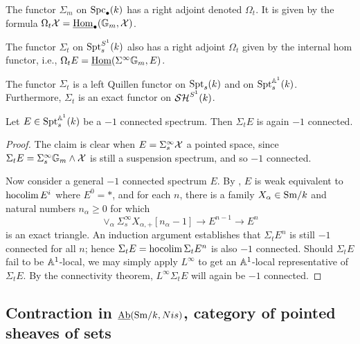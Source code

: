 \documentclass{amsart}%
\begin{document}
\begin{definition}
  The functor $\Sigma_m$ on $\mathrm{Spc}_{\bullet}(k)$ has a right adjoint
  denoted $\Omega_t$. It is given by the formula
  $\Omega_t\mathcal{X} = \underline{\operatorname{Hom}}_{\bullet}(\mathbb{G}_m,\mathcal{X})$.

  The functor $\Sigma_t$ on $\mathrm{Spt}_s^{S^1}(k)$ also has a right adjoint
  $\Omega_t$ given by the internal hom functor, i.e.,
  $\Omega_tE = \underline{\operatorname{Hom}}(\Sigma^{\infty}\mathbb{G}_{m}, E)$.
\end{definition}

\begin{proposition}
  The functor $\Sigma_t$ is a left Quillen functor on $\mathrm{Spt}_s(k)$ and
  on $\mathrm{Spt}_s^{\mathbb{A}^1}(k)$. Furthermore, $\Sigma_t$ is an exact functor
  on $\mathcal{SH}^{S^1}(k)$. 
\end{proposition}


\begin{lemma}
  Let $E \in \mathrm{Spt}_s^{\mathbb{A}^1}(k)$ be a $-1$ connected spectrum. Then
  $\Sigma_t E$ is again $-1$ connected.
\end{lemma}

\begin{proof}
  The claim is clear when $E = \Sigma^{\infty}_s \mathcal{X}$ a pointed
  space, since $\Sigma_t E = \Sigma^{\infty}_s \mathbb{G}_m \wedge \mathcal{X}$ is
  still a suspension spectrum, and so $-1$ connected. 

  Now consider a general $-1$ connected spectrum $E$. By \cite[Lemma
  3.3.4]{Mor05}, $E$ is weak equivalent to $ \operatorname{hocolim} E^i$ where
  $E^0 = *$, and for each $n$, there is a family
  $X_{\alpha} \in \mathrm{Sm}/k$ and natural numbers $n_{\alpha}\geq 0$ for
  which
  \begin{equation*}
    \vee_{\alpha}\Sigma^{\infty}_s X_{\alpha,+}[n_{\alpha}-1] \to E^{n-1} \to E^{n}
  \end{equation*}
  is an exact triangle. An induction argument establishes that
  $\Sigma_t E^{n}$ is still $-1$ connected for all $n$; hence
  $\Sigma_t E =\operatorname{hocolim} \Sigma_t E^n$ is also $-1$ connected. Should
  $\Sigma_t E$ fail to be $\mathbb{A}^1$-local, we may simply apply
  $L^{\infty}$ to get an $\mathbb{A}^1$-local representative of
  $\Sigma_t E$. By the connectivity theorem, $L^{\infty}\Sigma_t E$
  will again be $-1$ connected. 
\end{proof}

\subsection{Contraction in $\operatorname{\underline{Ab}}(\mathrm{Sm}/k,Nis)$, category of pointed
  sheaves of sets}
\end{document}

